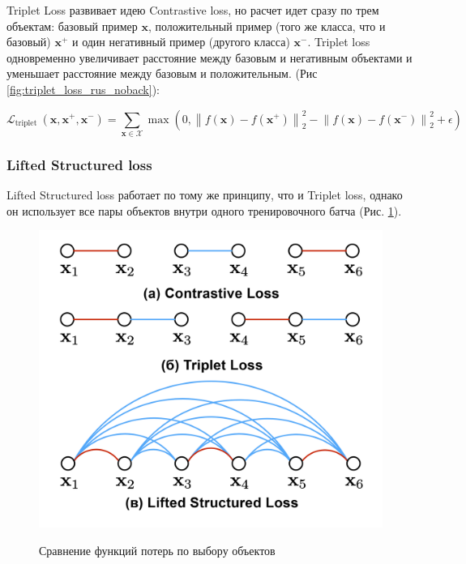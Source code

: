 \label{img:TripletLoss}
    Triplet Loss \cite{LossTriplet} развивает идею Contrastive loss, но расчет идет сразу по трем объектам: базовый пример $\mathbf{x}$, положительный  пример (того же класса, что и базовый) $\mathbf{x}^{+}$ и один негативный пример (другого класса) $\mathbf{x}^{-}$. Triplet loss одновременно увеличивает расстояние между базовым и негативным объектами и уменьшает расстояние между базовым и положительным. (Рис \ref{fig:triplet_loss_rus_noback}):

\begin{center}
$$
\mathcal{L}_{\text {triplet }}\left(\mathbf{x}, \mathbf{x}^{+}, \mathbf{x}^{-}\right)=\sum_{\mathbf{x} \in \mathcal{X}} \max \left(0,\left\|f(\mathbf{x})-f\left(\mathbf{x}^{+}\right)\right\|_2^2-\left\|f(\mathbf{x})-f\left(\mathbf{x}^{-}\right)\right\|_2^2+\epsilon\right)
$$
\end{center}

\subsubsection{Lifted Structured loss}
Lifted Structured loss \cite{LossLifted} работает по тому же принципу, что и Triplet loss, однако он использует все пары объектов внутри одного тренировочного батча (Рис. \ref{fig:lifted_structured_loss_rus_noback}).

\begin{figure}[h!]
\caption{Сравнение функций потерь по выбору объектов}
\centering
\includegraphics[width=16cm]{Images/lifted_structured_loss_rus_noback.png}
\label{fig:lifted_structured_loss_rus_noback}
\end{figure}


